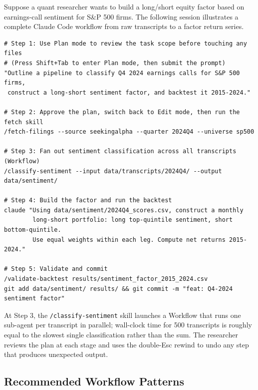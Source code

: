 \begin{example}
\label{ex:claude-code-sentiment-factor}
Suppose a quant researcher wants to build a long/short equity factor based on
earnings-call sentiment for S\&P 500 firms.  The following session illustrates
a complete Claude Code workflow from raw transcripts to a factor return series.

\begin{verbatim}
# Step 1: Use Plan mode to review the task scope before touching any files
# (Press Shift+Tab to enter Plan mode, then submit the prompt)
"Outline a pipeline to classify Q4 2024 earnings calls for S&P 500 firms,
 construct a long-short sentiment factor, and backtest it 2015-2024."

# Step 2: Approve the plan, switch back to Edit mode, then run the fetch skill
/fetch-filings --source seekingalpha --quarter 2024Q4 --universe sp500

# Step 3: Fan out sentiment classification across all transcripts (Workflow)
/classify-sentiment --input data/transcripts/2024Q4/ --output data/sentiment/

# Step 4: Build the factor and run the backtest
claude "Using data/sentiment/2024Q4_scores.csv, construct a monthly
        long-short portfolio: long top-quintile sentiment, short bottom-quintile.
        Use equal weights within each leg. Compute net returns 2015-2024."

# Step 5: Validate and commit
/validate-backtest results/sentiment_factor_2015_2024.csv
git add data/sentiment/ results/ && git commit -m "feat: Q4-2024 sentiment factor"
\end{verbatim}

At Step 3, the \texttt{/classify-sentiment} skill launches a Workflow that
runs one sub-agent per transcript in parallel; wall-clock time for 500
transcripts is roughly equal to the slowest single classification rather than
the sum.  The researcher reviews the plan at each stage and uses the double-Esc
rewind to undo any step that produces unexpected output.
\end{example}

\subsection{Recommended Workflow Patterns}
\label{app:claude-code:patterns}

